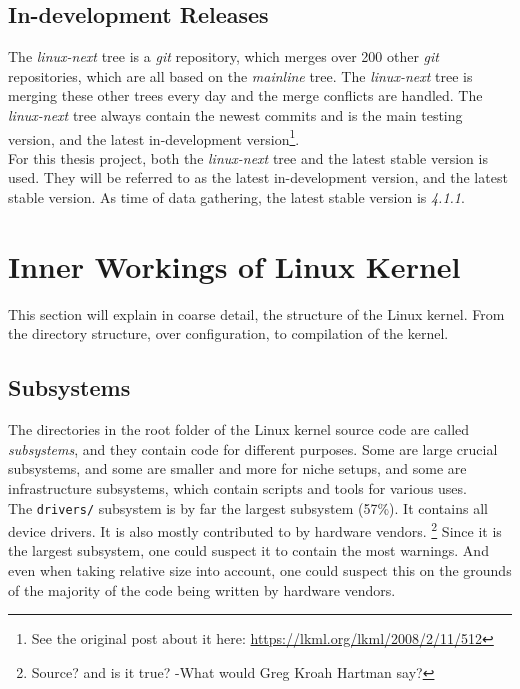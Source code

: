 \documentclass[a4paper,11pt]{report}
\newcommand{\f}{\footnote{\fn}}
\newcommand{\figa}{
    \begin{figure}[!htpb]
    \centering
}
\newcommand{\figb}[2]{
    \caption{#1}
    \label{#2}
    \end{figure}
}
\begin{document}
        \subsection*{In-development Releases}

        \def \fn {See the original post about it here: 
        \url{https://lkml.org/lkml/2008/2/11/512}}
The \emph{linux-next} tree is a \emph{git} repository, which 
merges over 200 other \emph{git} repositories\cite
    {nextTrees},
which are all based on the \emph{mainline} tree. The \emph{linux-next} tree is 
merging these other trees every day and the merge conflicts are handled. 
The \emph{linux-next} tree always contain the newest commits and is the main 
testing version, and the latest in-development version\f.
\\

For this thesis project, both the \emph{linux-next} tree and the latest stable 
version is used. They will be referred to as the latest in-development version, 
and the latest stable version. As time of data gathering, the latest stable 
version is \emph{4.1.1}.


    \section{Inner Workings of Linux Kernel}

This section will explain in coarse detail, the structure of the Linux kernel.
From the directory structure, over configuration, to compilation of the kernel.


        \subsection{Subsystems}

The directories in the root folder of the Linux kernel source code are called 
\emph{subsystems}, and they contain code for different purposes. Some are large 
crucial subsystems, and some are smaller and more for niche setups, and some 
are infrastructure subsystems\cite{42bugs}, which contain scripts and tools for
various uses.
\\

The \texttt{drivers/} subsystem is by far the largest subsystem (57\%). It 
contains all device drivers. It is also mostly contributed to by hardware 
vendors.
    \footnote{Source? and is it true? -What would Greg Kroah Hartman say?}
Since it is the largest subsystem, one could suspect it to contain the most 
warnings. And even when taking relative size into account, one could suspect this
on the grounds of the majority of the code being written by hardware vendors.
\\
\end{document}

